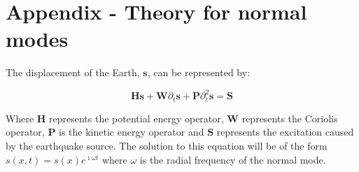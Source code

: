 \documentclass[11pt,a4paper,oneside,titlepage]{article}
\begin{document}



\appendix

\section{Appendix - Theory for normal modes}

The displacement of the Earth, $\mathbf{s}$, can be represented by:

\begin{equation}\label{eq:S}
\mathbf{Hs} + \mathbf{W}\partial_t \mathbf{s} + \mathbf{P}\partial_t^2
\mathbf{s} = \mathbf{S}
\end{equation}

Where $\mathbf{H}$ represents the potential energy operator, $\mathbf{W}$ represents the Coriolis operator, $\mathbf{P}$ is the kinetic energy operator and $\mathbf{S}$ represents the excitation caused by the earthquake source. The solution to this equation will be of the form $s(x,t) = s(x)e^{\imath \omega t}$ where $\omega$ is the radial frequency of the normal mode.
\end{document}
